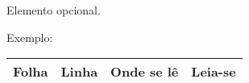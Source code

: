 
\begin{errata}
Elemento opcional. 

Exemplo:

\vspace{\onelineskip}

\begin{table}[htb]
\center
\begin{tabular}{|p{2.4cm}|p{2cm}|p{3cm}|p{3cm}|}
  \hline
   \textbf{Folha} & \textbf{Linha}  & \textbf{Onde se lê}  & \textbf{Leia-se}  \\
    \hline
    
   \hline
\end{tabular}
\end{table}

\end{errata}
